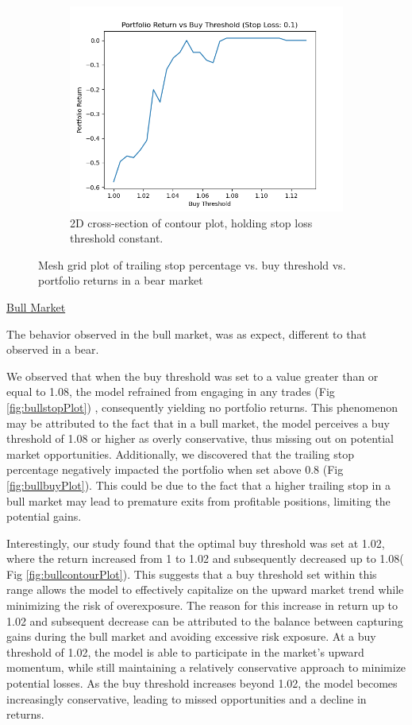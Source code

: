 \documentclass{article}
\begin{document}
\begin{figure}[H]
\begin{subfigure}{0.495\textwidth}
        \includegraphics[width=\linewidth]{stopSlice.png}
        \caption{2D cross-section of contour plot, holding stop loss threshold constant.}
        \label{fig:stopPlot}
    \end{subfigure}
    \caption{Mesh grid plot of trailing stop percentage vs. buy threshold vs. portfolio returns in a bear market}

\end{figure}

\underline{Bull Market}

The behavior observed in the bull market, was as expect, different to that observed in a bear.

We observed that when the buy threshold was set to a value greater than or equal to 1.08, the model refrained from engaging in any trades (Fig \ref{fig:bullstopPlot}) , consequently yielding no portfolio returns. This phenomenon may be attributed to the fact that in a bull market, the model perceives a buy threshold of 1.08 or higher as overly conservative, thus missing out on potential market opportunities. Additionally, we discovered that the trailing stop percentage negatively impacted the portfolio when set above 0.8 (Fig \ref{fig:bullbuyPlot}). This could be due to the fact that a higher trailing stop in a bull market may lead to premature exits from profitable positions, limiting the potential gains.

Interestingly, our study found that the optimal buy threshold was set at 1.02, where the return increased from 1 to 1.02 and subsequently decreased up to 1.08( Fig \ref{fig:bullcontourPlot}). This suggests that a buy threshold set within this range allows the model to effectively capitalize on the upward market trend while minimizing the risk of overexposure. The reason for this increase in return up to 1.02 and subsequent decrease can be attributed to the balance between capturing gains during the bull market and avoiding excessive risk exposure. At a buy threshold of 1.02, the model is able to participate in the market's upward momentum, while still maintaining a relatively conservative approach to minimize potential losses. As the buy threshold increases beyond 1.02, the model becomes increasingly conservative, leading to missed opportunities and a decline in returns.
\end{document}
